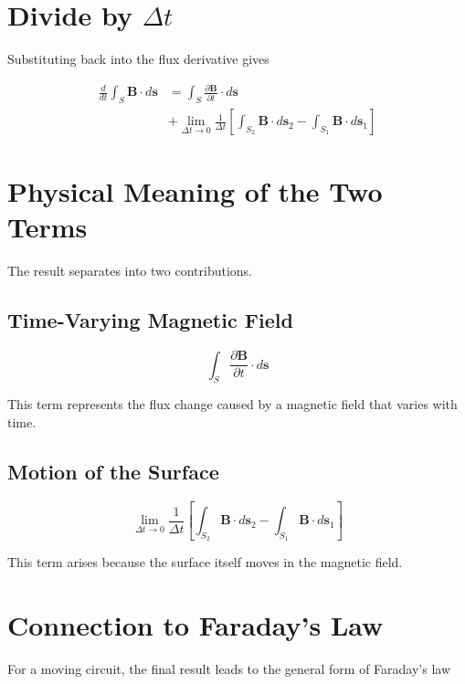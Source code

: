 \documentclass[12pt, a4paper]{article}
\begin{document}
\section{Divide by $\Delta t$}

Substituting back into the flux derivative gives

\begin{align}
\frac{d}{dt}\int_S \mathbf{B}\cdot d\mathbf{s}
&=
\int_S \frac{\partial \mathbf{B}}{\partial t}\cdot d\mathbf{s}
\\
&+
\lim_{\Delta t\rightarrow0}
\frac{1}{\Delta t}
\left[
\int_{S_2}\mathbf{B}\cdot d\mathbf{s}_2
-
\int_{S_1}\mathbf{B}\cdot d\mathbf{s}_1
\right]
\end{align}

\section{Physical Meaning of the Two Terms}

The result separates into two contributions.

\subsection{Time-Varying Magnetic Field}

\begin{equation}
\int_S \frac{\partial \mathbf{B}}{\partial t}\cdot d\mathbf{s}
\end{equation}

This term represents the flux change caused by a magnetic field that varies with time.

\subsection{Motion of the Surface}

\begin{equation}
\lim_{\Delta t\rightarrow0}
\frac{1}{\Delta t}
\left[
\int_{S_2}\mathbf{B}\cdot d\mathbf{s}_2
-
\int_{S_1}\mathbf{B}\cdot d\mathbf{s}_1
\right]
\end{equation}

This term arises because the surface itself moves in the magnetic field.

\section{Connection to Faraday's Law}

For a moving circuit, the final result leads to the general form of Faraday's law
\end{document}
